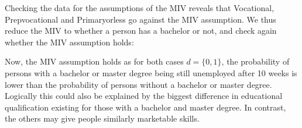 \documentclass[
]{article}
\newenvironment{Shaded}{\begin{snugshade}}{\end{snugshade}}
\newcommand{\CommentTok}[1]{\textcolor[rgb]{0.56,0.35,0.01}{\textit{#1}}}
\newcommand{\DecValTok}[1]{\textcolor[rgb]{0.00,0.00,0.81}{#1}}
\newcommand{\FunctionTok}[1]{\textcolor[rgb]{0.00,0.00,0.00}{#1}}
\newcommand{\NormalTok}[1]{#1}
\newcommand{\OtherTok}[1]{\textcolor[rgb]{0.56,0.35,0.01}{#1}}
\newcommand{\SpecialCharTok}[1]{\textcolor[rgb]{0.00,0.00,0.00}{#1}}
\begin{document}
\begin{Shaded}
\end{Shaded}

Checking the data for the assumptions of the MIV reveals that
Vocational, Prepvocational and Primaryorless go against the MIV
assumption. We thus reduce the MIV to whether a person has a bachelor or
not, and check again whether the MIV assumption holds:

\begin{Shaded}
\end{Shaded}

Now, the MIV assumption holds as for both cases \(d = \{0,1\}\), the
probability of persons with a bachelor or master degree being still
unemployed after 10 weeks is lower than the probability of persons
without a bachelor or master degree. Logically this could also be
explained by the biggest difference in educational qualification
existing for those with a bachelor and master degree. In contrast, the
others may give people similarly marketable skills.
\end{document}
